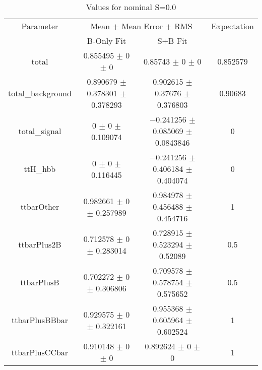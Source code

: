 \begin{table}
\centering
\caption{Values for nominal S=0.0}
\begin{tabular}{cccc}
\toprule
Parameter & \multicolumn{2}{c}{Mean $\pm$ Mean Error $\pm$ RMS} & Expectation\\
 & B-Only Fit & S+B Fit & \\
\midrule
total & \num{0.855495} $\pm$ \num{0} $\pm$ \num{0} & \num{0.85743} $\pm$ \num{0} $\pm$ \num{0} & \num{0.852579}\\
total\_background & \num{0.890679} $\pm$ \num{0.378301} $\pm$ \num{0.378293} & \num{0.902615} $\pm$ \num{0.37676} $\pm$ \num{0.376803} & \num{0.90683}\\
total\_signal & \num{0} $\pm$ \num{0} $\pm$ \num{0.109074} & \num{-0.241256} $\pm$ \num{0.085069} $\pm$ \num{0.0843846} & \num{0}\\
ttH\_hbb & \num{0} $\pm$ \num{0} $\pm$ \num{0.116445} & \num{-0.241256} $\pm$ \num{0.406184} $\pm$ \num{0.404074} & \num{0}\\
ttbarOther & \num{0.982661} $\pm$ \num{0} $\pm$ \num{0.257989} & \num{0.984978} $\pm$ \num{0.456488} $\pm$ \num{0.454716} & \num{1}\\
ttbarPlus2B & \num{0.712578} $\pm$ \num{0} $\pm$ \num{0.283014} & \num{0.728915} $\pm$ \num{0.523294} $\pm$ \num{0.52089} & \num{0.5}\\
ttbarPlusB & \num{0.702272} $\pm$ \num{0} $\pm$ \num{0.306806} & \num{0.709578} $\pm$ \num{0.578754} $\pm$ \num{0.575652} & \num{0.5}\\
ttbarPlusBBbar & \num{0.929575} $\pm$ \num{0} $\pm$ \num{0.322161} & \num{0.955368} $\pm$ \num{0.605964} $\pm$ \num{0.602524} & \num{1}\\
ttbarPlusCCbar & \num{0.910148} $\pm$ \num{0} $\pm$ \num{0} & \num{0.892624} $\pm$ \num{0} $\pm$ \num{0} & \num{1}\\
\bottomrule
\end{tabular}
\end{table}